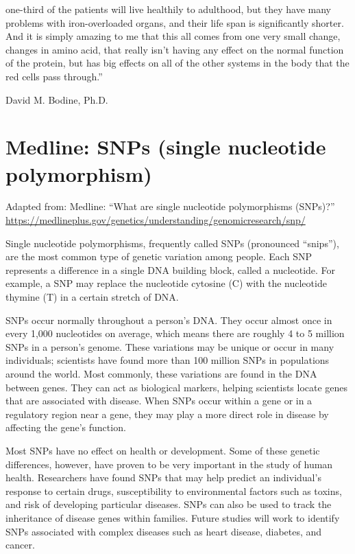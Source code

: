 \documentclass[
]{book}
\begin{document}
one-third of the patients will live healthily to adulthood, but they have many problems with iron-overloaded organs, and their life span is significantly shorter. And it is simply amazing to me that this all comes from one very small change, changes in amino acid, that really isn't having any effect on the normal function of the protein, but has big effects on all of the other systems in the body that the red cells pass through.''

David M. Bodine, Ph.D.

\hypertarget{medline-snps-single-nucleotide-polymorphism}{%
\section{Medline: SNPs (single nucleotide polymorphism)}\label{medline-snps-single-nucleotide-polymorphism}}

Adapted from: Medline: ``What are single nucleotide polymorphisms (SNPs)?''
\url{https://medlineplus.gov/genetics/understanding/genomicresearch/snp/}

Single nucleotide polymorphisms, frequently called SNPs (pronounced ``snips''), are the most common type of genetic variation among people. Each SNP represents a difference in a single DNA building block, called a nucleotide. For example, a SNP may replace the nucleotide cytosine (C) with the nucleotide thymine (T) in a certain stretch of DNA.

SNPs occur normally throughout a person's DNA. They occur almost once in every 1,000 nucleotides on average, which means there are roughly 4 to 5 million SNPs in a person's genome. These variations may be unique or occur in many individuals; scientists have found more than 100 million SNPs in populations around the world. Most commonly, these variations are found in the DNA between genes. They can act as biological markers, helping scientists locate genes that are associated with disease. When SNPs occur within a gene or in a regulatory region near a gene, they may play a more direct role in disease by affecting the gene's function.

Most SNPs have no effect on health or development. Some of these genetic differences, however, have proven to be very important in the study of human health. Researchers have found SNPs that may help predict an individual's response to certain drugs, susceptibility to environmental factors such as toxins, and risk of developing particular diseases. SNPs can also be used to track the inheritance of disease genes within families. Future studies will work to identify SNPs associated with complex diseases such as heart disease, diabetes, and cancer.
\end{document}
